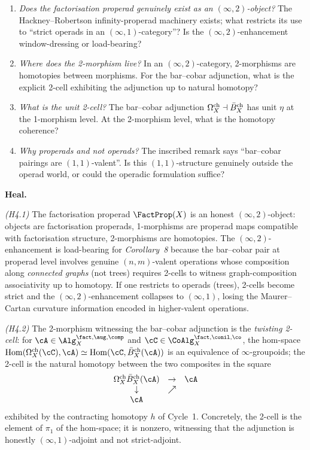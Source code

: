 \begin{enumerate}
\item[Q4.1] \emph{Does the factorisation properad genuinely exist as
an $(\infty,2)$-object?} The Hackney--Robertson infinity-properad
machinery exists; what restricts its use to ``strict operads in an
$(\infty,1)$-category''? Is the $(\infty,2)$-enhancement
window-dressing or load-bearing?
\item[Q4.2] \emph{Where does the 2-morphism live?} In an
$(\infty,2)$-category, 2-morphisms are homotopies between morphisms.
For the bar--cobar adjunction, what is the explicit 2-cell exhibiting
the adjunction up to natural homotopy?
\item[Q4.3] \emph{What is the unit 2-cell?} The bar--cobar adjunction
$\Omega^{\mathrm{ch}}_X\dashv\bar{B}^{\mathrm{ch}}_X$ has unit $\eta$ at the 1-morphism level.
At the 2-morphism level, what is the homotopy coherence?
\item[Q4.4] \emph{Why properads and not operads?} The inscribed
remark says ``bar--cobar pairings are $(1,1)$-valent''. Is this
$(1,1)$-structure genuinely outside the operad world, or could the
operadic formulation suffice?
\end{enumerate}

\medskip
\textbf{Heal.}

\emph{(H4.1)} The factorisation properad $\FactProp(X)$ is an honest
$(\infty,2)$-object: objects are factorisation properads, 1-morphisms
are properad maps compatible with factorisation structure,
2-morphisms are homotopies. The $(\infty,2)$-enhancement is
load-bearing for \emph{Corollary~8} because the bar--cobar pair at
properad level involves genuine $(n,m)$-valent operations whose
composition along \emph{connected graphs} (not trees) requires
2-cells to witness graph-composition associativity up to homotopy.
If one restricts to operads (trees), 2-cells become strict and the
$(\infty,2)$-enhancement collapses to $(\infty,1)$, losing the
Maurer--Cartan curvature information encoded in higher-valent
operations.

\emph{(H4.2)} The 2-morphism witnessing the bar--cobar adjunction is
the \emph{twisting 2-cell}: for $\cA\in\Alg^{\fact,\aug,\comp}_{X}$
and $\cC\in\CoAlg^{\fact,\conil,\co}_{X}$, the hom-space
$\Hom(\Omegach_X(\cC),\cA) \simeq \Hom(\cC,\Bbarch_X(\cA))$
is an equivalence of $\infty$-groupoids; the 2-cell is the natural
homotopy between the two composites in the square
\[
\begin{array}{ccc}
\Omegach_X\Bbarch_X(\cA) & \to & \cA\\
\downarrow & \nearrow & \\
\cA & &
\end{array}
\]
exhibited by the contracting homotopy $h$ of Cycle~1. Concretely, the
2-cell is the element of $\pi_{1}$ of the hom-space; it is nonzero,
witnessing that the adjunction is honestly $(\infty,1)$-adjoint and
not strict-adjoint.

